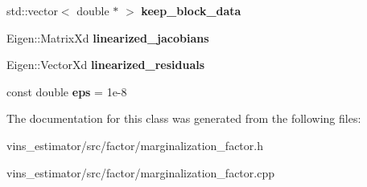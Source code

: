 \begin{DoxyCompactItemize}
\mbox{\label{classMarginalizationInfo_a1f07adc0ed5f594f513e61df03250468}} 
std\+::vector$<$ double $\ast$ $>$ {\bfseries keep\+\_\+block\+\_\+data}
\item 
\mbox{\label{classMarginalizationInfo_a091632ce615c2ec23a15d7d01a722d39}} 
Eigen\+::\+Matrix\+Xd {\bfseries linearized\+\_\+jacobians}
\item 
\mbox{\label{classMarginalizationInfo_a940ac649b07f28c403bb4d83bdf9e21d}} 
Eigen\+::\+Vector\+Xd {\bfseries linearized\+\_\+residuals}
\item 
\mbox{\label{classMarginalizationInfo_ac0dc64e450ec1defc1e62919a242fea7}} 
const double {\bfseries eps} = 1e-\/8
\end{DoxyCompactItemize}


The documentation for this class was generated from the following files\+:\begin{DoxyCompactItemize}
\item 
vins\+\_\+estimator/src/factor/marginalization\+\_\+factor.\+h\item 
vins\+\_\+estimator/src/factor/marginalization\+\_\+factor.\+cpp\end{DoxyCompactItemize}
